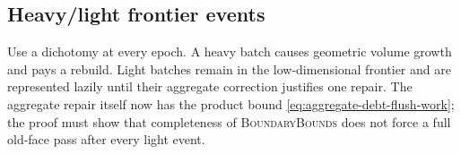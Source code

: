 \subsection{Heavy/light frontier events}

Use a dichotomy at every epoch.  A heavy batch causes geometric volume growth
and pays a rebuild.  Light batches remain in the low-dimensional frontier and
are represented lazily until their aggregate correction justifies one repair.
The aggregate repair itself now has the product bound
\cref{eq:aggregate-debt-flush-work}; the proof must show that completeness of
\textsc{BoundaryBounds} does not force a full old-face pass after every light
event.
